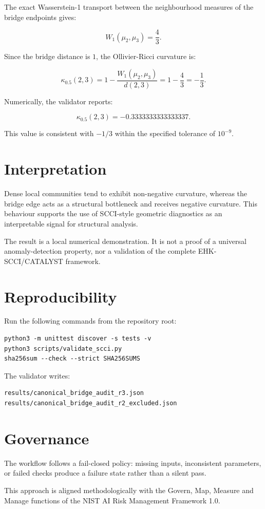 \documentclass[11pt]{article}
\begin{document}
The exact Wasserstein-1 transport between the neighbourhood measures of the
bridge endpoints gives:

\[
W_1(\mu_2,\mu_3)=\frac{4}{3}.
\]

Since the bridge distance is $1$, the Ollivier-Ricci curvature is:

\[
\kappa_{0.5}(2,3)
=
1-\frac{W_1(\mu_2,\mu_3)}{d(2,3)}
=
1-\frac{4}{3}
=
-\frac{1}{3}.
\]

Numerically, the validator reports:

\[
\kappa_{0.5}(2,3)=-0.3333333333333337.
\]

This value is consistent with $-1/3$ within the specified tolerance of
$10^{-9}$.

\section{Interpretation}

Dense local communities tend to exhibit non-negative curvature, whereas the
bridge edge acts as a structural bottleneck and receives negative curvature.
This behaviour supports the use of SCCI-style geometric diagnostics as an
interpretable signal for structural analysis.

The result is a local numerical demonstration. It is not a proof of a
universal anomaly-detection property, nor a validation of the complete
EHK-SCCI/CATALYST framework.

\section{Reproducibility}

Run the following commands from the repository root:

\begin{verbatim}
python3 -m unittest discover -s tests -v
python3 scripts/validate_scci.py
sha256sum --check --strict SHA256SUMS
\end{verbatim}

The validator writes:

\begin{verbatim}
results/canonical_bridge_audit_r3.json
results/canonical_bridge_audit_r2_excluded.json
\end{verbatim}

\section{Governance}

The workflow follows a fail-closed policy: missing inputs, inconsistent
parameters, or failed checks produce a failure state rather than a silent
pass.

This approach is aligned methodologically with the Govern, Map, Measure and
Manage functions of the NIST AI Risk Management Framework 1.0.
\end{document}
